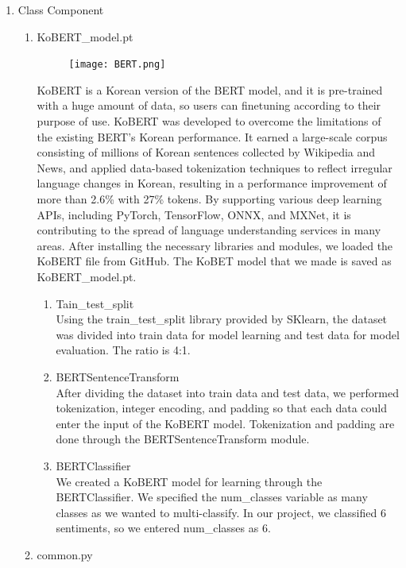 \documentclass[conference]{IEEEtran}
\begin{document}
\begin{enumerate}
\begin{enumerate}
            \item Class Component
            \begin{enumerate}
                \item KoBERT\_model.pt
                \begin{figure}[H]
                 \centering
                 \texttt{[image: BERT.png]}
                 \end{figure}
                KoBERT is a Korean version of the BERT model, and it is pre-trained with a huge amount of data, so users can finetuning according to their purpose of use. KoBERT was developed to overcome the limitations of the existing BERT's Korean performance. It earned a large-scale corpus consisting of millions of Korean sentences collected by Wikipedia and News, and applied data-based tokenization techniques to reflect irregular language changes in Korean, resulting in a performance improvement of more than 2.6\% with 27\% tokens. By supporting various deep learning APIs, including PyTorch, TensorFlow, ONNX, and MXNet, it is contributing to the spread of language understanding services in many areas. After installing the necessary libraries and modules, we loaded the KoBERT file from GitHub. The KoBET model that we made is saved as KoBERT\_model.pt.
                \begin{enumerate}
                     \item Tain\_test\_split
                \\Using the train\_test\_split library provided by SKlearn, the dataset was divided into train data for model learning and test data for model evaluation. The ratio is 4:1.
                \item BERTSentenceTransform
                \\After dividing the dataset into train data and test data, we performed tokenization, integer encoding, and padding so that each data could enter the input of the KoBERT model. Tokenization and padding are done through the BERTSentenceTransform module.
                \item BERTClassifier
                \\We created a KoBERT model for learning through the BERTClassifier. We specified the num\_classes variable as many classes as we wanted to multi-classify. In our project, we classified 6 sentiments, so we entered num\_classes as 6.
                \end{enumerate}
                \item common.py \\

\end{enumerate}
\end{enumerate}
\end{enumerate}
\end{document}
